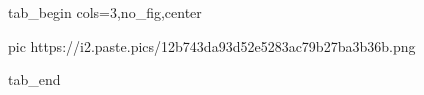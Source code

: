  
 
 
 
 


\ifcmt
  tab_begin cols=3,no_fig,center

     pic https://i2.paste.pics/12b743da93d52e5283ac79b27ba3b36b.png

  tab_end
\fi
